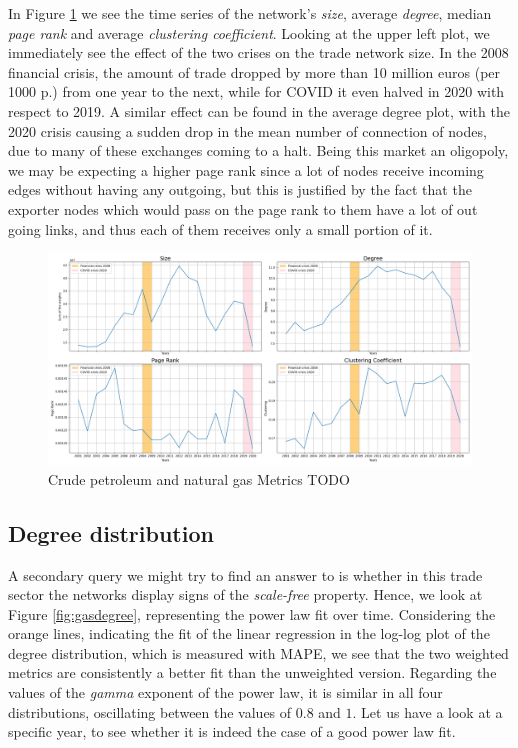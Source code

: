 In Figure \ref{fig:gasmetrics} we see the time series of the network's \textit{size}, average \textit{degree}, median \textit{page rank} and average \textit{clustering coefficient}. Looking at the upper left plot, we immediately see the effect of the two crises on the trade network size. In the 2008 financial crisis, the amount of trade dropped by more than 10 million euros (per 1000 p.) from one year to the next, while for COVID it even halved in 2020 with respect to 2019. A similar effect can be found in the average degree plot, with the 2020 crisis causing a sudden drop in the mean number of connection of nodes, due to many of these exchanges coming to a halt. Being this market an oligopoly, we may be expecting a higher page rank since a lot of nodes receive incoming edges without having any outgoing, but this is justified by the fact that the exporter nodes which would pass on the page rank to them have a lot of out going links, and thus each of them receives only a small portion of it.

\begin{figure}
    \centering
    \includegraphics[width=\textwidth]{pics/full_p06_metric_ts.png}
    \caption{Crude petroleum and natural gas Metrics TODO}
    \label{fig:gasmetrics}
\end{figure}

\subsection{Degree distribution}

A secondary query we might try to find an answer to is whether in this trade sector the networks display signs of the \textit{scale-free} property. Hence, we look at Figure \ref{fig:gasdegree}, representing the power law fit over time. Considering the orange lines, indicating the fit of the linear regression in the log-log plot of the degree distribution, which is measured with MAPE, we see that the two weighted metrics are consistently a better fit than the unweighted version. Regarding the values of the \textit{gamma} exponent of the power law, it is similar in all four distributions, oscillating between the values of $0.8$ and $1$. Let us have a look at a specific year, to see whether it is indeed the case of a good power law fit.

